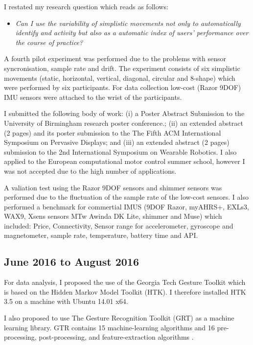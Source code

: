 \documentclass[10pt,journal,onecolumn,compsoc]{IEEEtran}
\begin{document}
I restated my research question which reads as follows:
\begin{itemize}
 \item \textit{Can I use the variability of simplistic movements not only to automatically identify
and activity but also as a automatic index of users' performance over the course of practice?}
\end{itemize}

A fourth pilot experiment was performed due to the problems with sensor syncronisation, sample rate and drift.
The experiment consists of six simplistic movements 
(static, horizontal, vertical, diagonal, circular and 8-shape)
which were performed by six participants. 
For data collection low-cost (Razor 9DOF) IMU sensors were attached to the wrist of the participants.

I submitted the following body of work:
(i) a Poster Abstract Submission to the University of Birmingham research poster conference.;
(ii) an extended abstract (2 pages)  and its poster submission to the The Fifth ACM International 
Symposium on Pervasive Displays; and
(iii) an extended abstract (2 pages) submission to the 2nd International Symposium on Wearable Robotics.
I also applied to the European computational motor control summer school,
however I was not accepted due to the high number of applications.

A valiation test using the Razor 9DOF sensors and shimmer sensors
was performed 
due to the fluctuation of the sample rate of the low-cost sensors.
I also performed a benchmark for commertial IMUS
(9DOF Razor, myAHRS+, EXLs3, WAX9, Xsens sensors MTw Awinda DK Lite, shimmer and Muse)
which included:
Price, Connectivity, Sensor range for accelerometer, gyroscope and magnetometer, 
sample rate, temperature, battery time and API.



\subsection{June 2016 to August 2016}

For data analysis, I proposed the use of the Georgia Tech Gesture Toolkit \cite{Westeyn2003}
which is based on the Hidden Markov Model Toolkit (HTK).
I therefore installed HTK 3.5 on a machine with Ubuntu 14.01 x64.

I also proposed to use The Gesture Recognition Toolkit (GRT) as a machine learning library.
GTR contains 15 machine-learning algorithms and 16 pre-processing, post-processing, and feature-extraction algorithms 
\cite{Gillian2014}.
\end{document}
